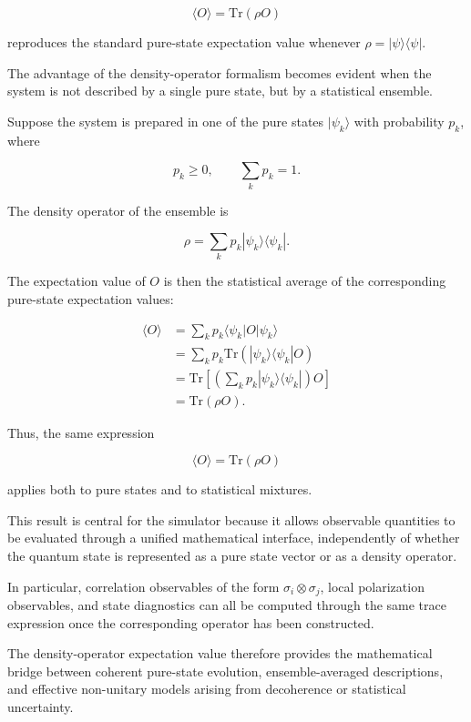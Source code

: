 \begin{equation}
\boxed{
\langle O \rangle
=
\mathrm{Tr}(\rho O)
}
\label{eq:density_expectation_general_result}
\end{equation}

reproduces the standard pure-state expectation value whenever \( \rho = |\psi\rangle \langle \psi| \).

\medskip

The advantage of the density-operator formalism becomes evident when the system is not described by a single pure state, but by a statistical ensemble.

Suppose the system is prepared in one of the pure states \( |\psi_k\rangle \) with probability \( p_k \), where

\[
p_k \geq 0,
\qquad
\sum_k p_k = 1.
\]

The density operator of the ensemble is

\begin{equation}
\rho
=
\sum_k
p_k
|\psi_k\rangle \langle \psi_k|.
\label{eq:ensemble_density_operator_derivation}
\end{equation}

The expectation value of \( O \) is then the statistical average of the corresponding pure-state expectation values:

\begin{align}
\langle O \rangle
&=
\sum_k
p_k
\langle \psi_k | O | \psi_k \rangle
\nonumber
\\
&=
\sum_k
p_k
\mathrm{Tr}
\left(
|\psi_k\rangle \langle \psi_k| O
\right)
\nonumber
\\
&=
\mathrm{Tr}
\left[
\left(
\sum_k
p_k
|\psi_k\rangle \langle \psi_k|
\right)
O
\right]
\nonumber
\\
&=
\mathrm{Tr}(\rho O).
\label{eq:ensemble_expectation_density_form}
\end{align}

Thus, the same expression

\begin{equation}
\langle O \rangle
=
\mathrm{Tr}(\rho O)
\label{eq:density_expectation_final}
\end{equation}

applies both to pure states and to statistical mixtures.

\medskip

This result is central for the simulator because it allows observable quantities to be evaluated through a unified mathematical interface, independently of whether the quantum state is represented as a pure state vector or as a density operator.

In particular, correlation observables of the form \( \sigma_i \otimes \sigma_j \), local polarization observables, and state diagnostics can all be computed through the same trace expression once the corresponding operator has been constructed.

\medskip

The density-operator expectation value therefore provides the mathematical bridge between coherent pure-state evolution, ensemble-averaged descriptions, and effective non-unitary models arising from decoherence or statistical uncertainty.